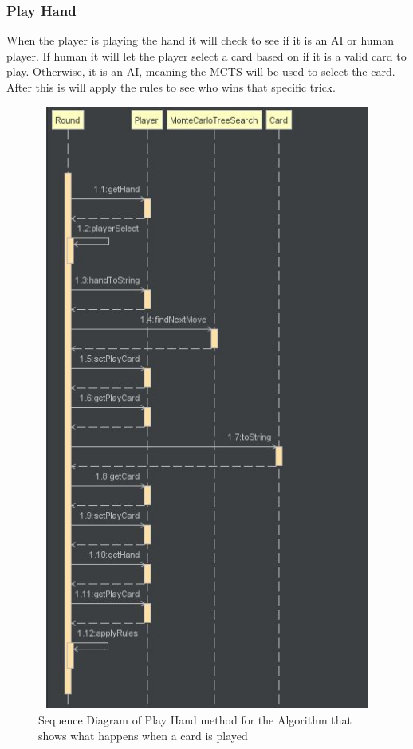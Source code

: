 \subsubsection{Play Hand}
When the player is playing the hand it will check to see if it is an AI or human player. If human it will let the player select a card based on if it is  a valid card to play. Otherwise, it is an AI, meaning   the MCTS will be used to select the card. After this is will apply the rules to see who wins that specific trick.
\begin{figure}
\centering
\includegraphics[width=15cm ,height=20cm,keepaspectratio]{PlayHandSequenceDiagram}
\caption{Sequence Diagram of Play Hand method for the Algorithm that shows what happens when a card is played}
\label{fig:Play}
\end{figure}
